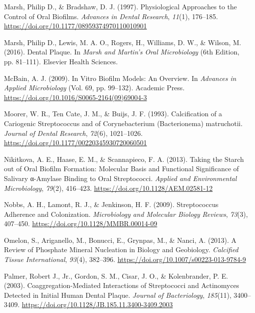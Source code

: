 \documentclass[
  letterpaper,
]{book}
\newlength{\cslhangindent}
\newlength{\cslentryspacingunit} %
\newenvironment{CSLReferences}[2] %
 {%
  \setlength{\parindent}{0pt}
  \ifodd #1
  \let\oldpar\par
  \def\par{\hangindent=\cslhangindent\oldpar}
  \fi
  \setlength{\parskip}{#2\cslentryspacingunit}
 }%
 {}
\begin{document}
\begin{CSLReferences}{1}{0}
\leavevmode{}%
Marsh, Philip D., \& Bradshaw, D. J. (1997). Physiological {Approaches}
to the {Control} of {Oral Biofilms}. \emph{Advances in Dental Research},
\emph{11}(1), 176--185.
\url{https://doi.org/10.1177/08959374970110010901}

\leavevmode{}%
Marsh, Philip D., Lewis, M. A. O., Rogers, H., Williams, D. W., \&
Wilson, M. (2016). Dental {Plaque}. In \emph{Marsh and {Martin}'s {Oral
Microbiology}} (6th Edition, pp. 81--111). {Elsevier Health Sciences}.

\leavevmode{}%
McBain, A. J. (2009). In {Vitro Biofilm Models}: {An Overview}. In
\emph{Advances in {Applied Microbiology}} (Vol. 69, pp. 99--132).
{Academic Press}. \url{https://doi.org/10.1016/S0065-2164(09)69004-3}

\leavevmode{}%
Moorer, W. R., Ten Cate, J. M., \& Buijs, J. F. (1993). Calcification of
a {Cariogenic Streptococcus} and of {Corynebacterium} ({Bacterionema})
matruchotii. \emph{Journal of Dental Research}, \emph{72}(6),
1021--1026. \url{https://doi.org/10.1177/00220345930720060501}

\leavevmode{}%
Nikitkova, A. E., Haase, E. M., \& Scannapieco, F. A. (2013). Taking the
{Starch} out of {Oral Biofilm Formation}: {Molecular Basis} and
{Functional Significance} of {Salivary} α-{Amylase Binding} to {Oral
Streptococci}. \emph{Applied and Environmental Microbiology},
\emph{79}(2), 416--423. \url{https://doi.org/10.1128/AEM.02581-12}

\leavevmode{}%
Nobbs, A. H., Lamont, R. J., \& Jenkinson, H. F. (2009). Streptococcus
{Adherence} and {Colonization}. \emph{Microbiology and Molecular Biology
Reviews}, \emph{73}(3), 407--450.
\url{https://doi.org/10.1128/MMBR.00014-09}

\leavevmode{}%
Omelon, S., Ariganello, M., Bonucci, E., Grynpas, M., \& Nanci, A.
(2013). A {Review} of {Phosphate Mineral Nucleation} in {Biology} and
{Geobiology}. \emph{Calcified Tissue International}, \emph{93}(4),
382--396. \url{https://doi.org/10.1007/s00223-013-9784-9}

\leavevmode{}%
Palmer, Robert J., Jr., Gordon, S. M., Cisar, J. O., \& Kolenbrander, P.
E. (2003). Coaggregation-{Mediated Interactions} of {Streptococci} and
{Actinomyces Detected} in {Initial Human Dental Plaque}. \emph{Journal
of Bacteriology}, \emph{185}(11), 3400--3409.
\url{https://doi.org/10.1128/JB.185.11.3400-3409.2003}


\end{CSLReferences}
\end{document}
